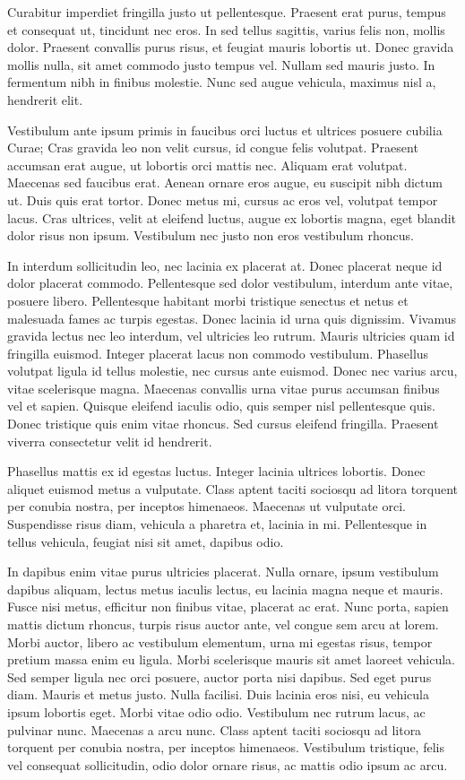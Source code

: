 Curabitur imperdiet fringilla justo ut pellentesque. Praesent erat purus, tempus et consequat ut, tincidunt nec eros. In sed tellus sagittis, varius felis non, mollis dolor. Praesent convallis purus risus, et feugiat mauris lobortis ut. Donec gravida mollis nulla, sit amet commodo justo tempus vel. Nullam sed mauris justo. In fermentum nibh in finibus molestie. Nunc sed augue vehicula, maximus nisl a, hendrerit elit.

Vestibulum ante ipsum primis in faucibus orci luctus et ultrices posuere cubilia Curae; Cras gravida leo non velit cursus, id congue felis volutpat. Praesent accumsan erat augue, ut lobortis orci mattis nec. Aliquam erat volutpat. Maecenas sed faucibus erat. Aenean ornare eros augue, eu suscipit nibh dictum ut. Duis quis erat tortor. Donec metus mi, cursus ac eros vel, volutpat tempor lacus. Cras ultrices, velit at eleifend luctus, augue ex lobortis magna, eget blandit dolor risus non ipsum. Vestibulum nec justo non eros vestibulum rhoncus.

In interdum sollicitudin leo, nec lacinia ex placerat at. Donec placerat neque id dolor placerat commodo. Pellentesque sed dolor vestibulum, interdum ante vitae, posuere libero. Pellentesque habitant morbi tristique senectus et netus et malesuada fames ac turpis egestas. Donec lacinia id urna quis dignissim. Vivamus gravida lectus nec leo interdum, vel ultricies leo rutrum. Mauris ultricies quam id fringilla euismod. Integer placerat lacus non commodo vestibulum. Phasellus volutpat ligula id tellus molestie, nec cursus ante euismod. Donec nec varius arcu, vitae scelerisque magna. Maecenas convallis urna vitae purus accumsan finibus vel et sapien. Quisque eleifend iaculis odio, quis semper nisl pellentesque quis. Donec tristique quis enim vitae rhoncus. Sed cursus eleifend fringilla. Praesent viverra consectetur velit id hendrerit.

Phasellus mattis ex id egestas luctus. Integer lacinia ultrices lobortis. Donec aliquet euismod metus a vulputate. Class aptent taciti sociosqu ad litora torquent per conubia nostra, per inceptos himenaeos. Maecenas ut vulputate orci. Suspendisse risus diam, vehicula a pharetra et, lacinia in mi. Pellentesque in tellus vehicula, feugiat nisi sit amet, dapibus odio.

In dapibus enim vitae purus ultricies placerat. Nulla ornare, ipsum vestibulum dapibus aliquam, lectus metus iaculis lectus, eu lacinia magna neque et mauris. Fusce nisi metus, efficitur non finibus vitae, placerat ac erat. Nunc porta, sapien mattis dictum rhoncus, turpis risus auctor ante, vel congue sem arcu at lorem. Morbi auctor, libero ac vestibulum elementum, urna mi egestas risus, tempor pretium massa enim eu ligula. Morbi scelerisque mauris sit amet laoreet vehicula. Sed semper ligula nec orci posuere, auctor porta nisi dapibus. Sed eget purus diam. Mauris et metus justo. Nulla facilisi. Duis lacinia eros nisi, eu vehicula ipsum lobortis eget. Morbi vitae odio odio. Vestibulum nec rutrum lacus, ac pulvinar nunc. Maecenas a arcu nunc. Class aptent taciti sociosqu ad litora torquent per conubia nostra, per inceptos himenaeos. Vestibulum tristique, felis vel consequat sollicitudin, odio dolor ornare risus, ac mattis odio ipsum ac arcu.

